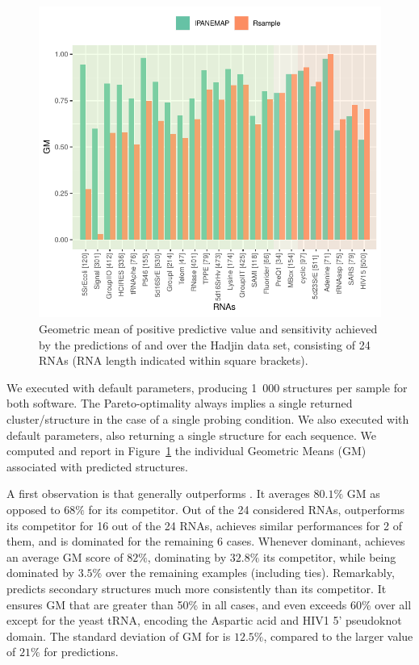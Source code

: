 \documentclass[a4,center,fleqn]{NAR}
\begin{document}
\begin{figure}
	\includegraphics[width=\linewidth]{graphs/RsampleVsIPANEMAP/Accuracy}
	\caption{Geometric mean of positive predictive value and sensitivity achieved by the predictions of \OurTool{} and  over the Hadjin\etal\cite{Hajdin2013} data set, consisting of 24 RNAs (RNA length indicated within square brackets). \label{fig:Vsrsample}}
\end{figure}

We executed \OurTool with default parameters, producing 1~000 structures per sample for both software. The Pareto-optimality always implies a single returned cluster/structure in the case of a single probing condition. 
We also executed  with default parameters, also returning a single structure for each sequence. 
We computed and report in Figure~\ref{fig:Vsrsample} the individual Geometric Means (GM) associated with predicted structures.


A first observation is that \OurTool generally outperforms . It averages $80.1\%$ GM as opposed to $68\%$ for its competitor.  Out of the 24 considered RNAs, \OurTool outperforms its competitor for 16 out of the 24 RNAs, achieves similar performances for 2 of them, and is dominated for the remaining 6 cases. Whenever dominant, \OurTool achieves an average GM score of $82\%$, dominating by $32.8\%$ its competitor, while being dominated by $3.5\%$ over the remaining examples (including ties). 
Remarkably, \OurTool predicts secondary structures much more consistently than its competitor. 
It ensures GM that are greater than 50\% in all cases, and even exceeds 60\% over all except for the yeast tRNA, encoding the Aspartic acid and HIV1 5' pseudoknot domain. The standard deviation of GM for \OurTool is $12.5\%$, compared to the larger value of $21\%$ for  predictions.
\end{document}
